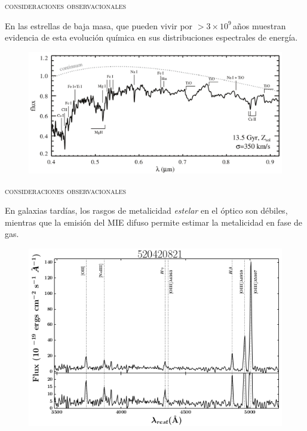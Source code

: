 \documentclass[xcolor=dvipsnames,4pt,hyperref={colorlinks,citecolor=black,linkcolor=black,urlcolor=black}]{beamer}
\begin{document}
\begin{frame}{\textsc{consideraciones observacionales}}

En las estrellas de baja masa, que pueden vivir por $>3\times10^9\,$años muestran evidencia de esta
evolución química en sus distribuciones espectrales de energía.
\begin{figure}
\includegraphics[scale=1]{img/conroy2014-1}
\end{figure}
\end{frame}

\begin{frame}{\textsc{consideraciones observacionales}}

En galaxias tardías, los rasgos de metalicidad \emph{estelar} en el óptico son débiles, mientras que
la emisión del MIE difuso permite estimar la metalicidad en fase de gas.
\begin{figure}
\includegraphics[scale=1]{img/calabro2017-2}
\end{figure}
\end{frame}
\end{document}
